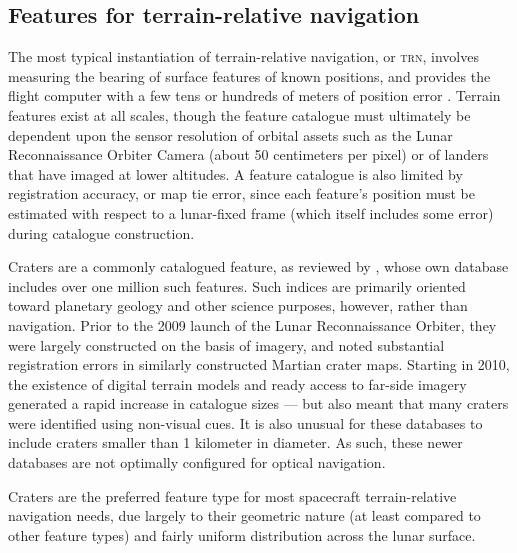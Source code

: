 \documentclass[12pt]{article}
\begin{document}

\subsection{Features for terrain-relative navigation}
The most typical instantiation of terrain-relative navigation, or \textsc{trn}, involves measuring the bearing of surface features of known positions, and provides the flight computer with a few tens or hundreds of meters of position error \citep{Christensen2011}. Terrain features exist at all scales, though the feature catalogue must ultimately be dependent upon the sensor resolution of orbital assets such as the Lunar Reconnaissance Orbiter Camera (about 50 centimeters per pixel) or of landers that have imaged at lower altitudes. A feature catalogue is also limited by registration accuracy, or map tie error, since each feature's position must be estimated with respect to a lunar-fixed frame (which itself includes some error) during catalogue construction.

Craters are a commonly catalogued feature, as reviewed by \citet{Robbins2019}, whose own database includes over one million such features. Such indices are primarily oriented toward planetary geology and other science purposes, however, rather than navigation. Prior to the 2009 launch of the Lunar Reconnaissance Orbiter, they were largely constructed on the basis of imagery, and \citet{Salamuniccar2008} noted substantial registration errors in similarly constructed Martian crater maps. Starting in 2010, the existence of digital terrain models and ready access to far-side imagery generated a rapid increase in catalogue sizes --- but also meant that many craters were identified using non-visual cues. It is also unusual for these databases to include craters smaller than 1 kilometer in diameter. As such, these newer databases are not optimally configured for optical navigation.

Craters are the preferred feature type for most spacecraft terrain-relative navigation needs, due largely to their geometric nature (at least compared to other feature types) and fairly uniform distribution across the lunar surface.
\end{document}
